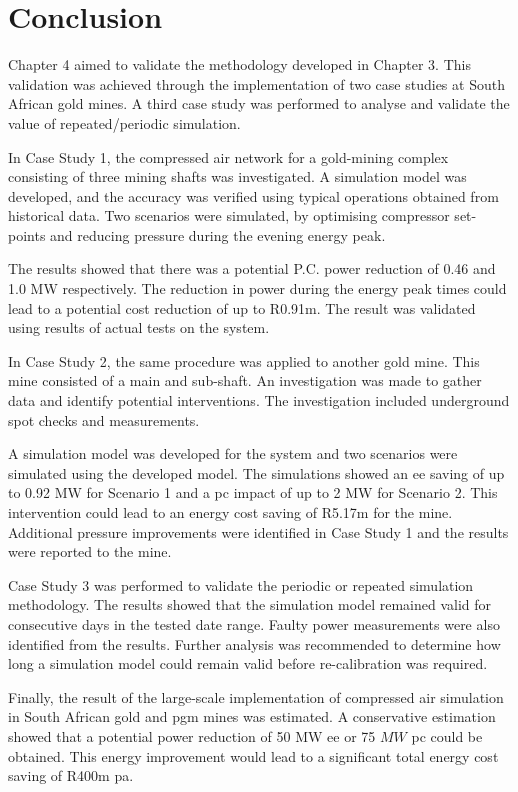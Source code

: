 \section{Conclusion}
Chapter 4 aimed to validate the methodology developed in Chapter 3. This validation was achieved through the implementation of two case studies at South African gold mines. A third case study was performed to analyse and validate the value of repeated/periodic simulation.
\par 
In Case Study 1, the compressed air network for a gold-mining complex consisting of three mining shafts was investigated. A simulation model was developed, and the accuracy was verified using typical operations obtained from historical data. Two scenarios were simulated, by optimising compressor set-points and reducing pressure during the evening energy peak.
\par 
The results showed that there was a potential P.C. power reduction of 0.46 and 1.0 MW respectively. The reduction in power during the energy peak times could lead to a potential cost reduction of up to R0.91m. The result was validated using results of actual tests on the system.
\par
In Case Study 2, the same procedure was applied to another gold mine. This mine consisted of a main and sub-shaft. An investigation was made to gather data and identify potential interventions. The investigation included underground spot checks and measurements.
\par 
A simulation model was developed for the system and two scenarios were simulated using the developed model. The simulations showed an \gls{ee} saving of up to 0.92 MW for Scenario 1 and a \gls{pc} impact of up to 2 MW for Scenario 2. This intervention could lead to an energy cost saving of R5.17m for the mine. Additional pressure improvements were identified in Case Study 1 and the results were reported to the mine.
\par
Case Study 3 was performed to validate the periodic or repeated simulation methodology. The results showed that the simulation model remained valid for consecutive days in the tested date range. Faulty power measurements were also identified from the results. Further analysis was recommended to determine how long a simulation model could remain valid before re-calibration was required.
\par 
Finally, the result of the large-scale implementation of compressed air simulation in South African gold and \gls{pgm} mines was estimated. A conservative estimation showed that a potential power reduction of 50 MW \gls{ee} or 75 $ MW $ \gls{pc} could be obtained. This energy improvement would lead to a significant total energy cost saving of R400m \gls{pa}.
